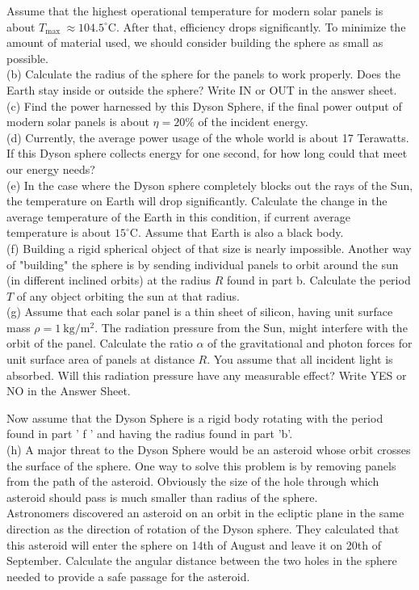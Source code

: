 \documentclass[10pt]{article}
\begin{document}
Assume that the highest operational temperature for modern solar panels is about $T_{\text {max }} \approx 104.5^{\circ} \mathrm{C}$. After that, efficiency drops significantly. To minimize the amount of material used, we should consider building the sphere as small as possible.\\
(b) Calculate the radius of the sphere for the panels to work properly. Does the Earth stay inside or outside the sphere? Write IN or OUT in the answer sheet.\\
(c) Find the power harnessed by this Dyson Sphere, if the final power output of modern solar panels is about $\eta=20 \%$ of the incident energy.\\
(d) Currently, the average power usage of the whole world is about 17 Terawatts. If this Dyson sphere collects energy for one second, for how long could that meet our energy needs?\\
(e) In the case where the Dyson sphere completely blocks out the rays of the Sun, the temperature on Earth will drop significantly. Calculate the change in the average temperature of the Earth in this condition, if current average temperature is about $15^{\circ} \mathrm{C}$. Assume that Earth is also a black body.\\
(f) Building a rigid spherical object of that size is nearly impossible. Another way of "building" the sphere is by sending individual panels to orbit around the sun (in different inclined orbits) at the radius $R$ found in part b. Calculate the period $T$ of any object orbiting the sun at that radius.\\
(g) Assume that each solar panel is a thin sheet of silicon, having unit surface mass $\rho=1 \mathrm{~kg} / \mathrm{m}^{2}$. The radiation pressure from the Sun, might interfere with the orbit of the panel. Calculate the ratio $\alpha$ of the gravitational and photon forces for unit surface area of panels at distance $R$. You assume that all incident light is absorbed. Will this radiation pressure have any measurable effect? Write YES or NO in the Answer Sheet.

Now assume that the Dyson Sphere is a rigid body rotating with the period found in part ' f ' and having the radius found in part 'b'.\\
(h) A major threat to the Dyson Sphere would be an asteroid whose orbit crosses the surface of the sphere. One way to solve this problem is by removing panels from the path of the asteroid. Obviously the size of the hole through which asteroid should pass is much smaller than radius of the sphere.\\
Astronomers discovered an asteroid on an orbit in the ecliptic plane in the same direction as the direction of rotation of the Dyson sphere. They calculated that this asteroid will enter the sphere on 14th of August and leave it on 20th of September. Calculate the angular distance between the two holes in the sphere needed to provide a safe passage for the asteroid.
\end{document}
